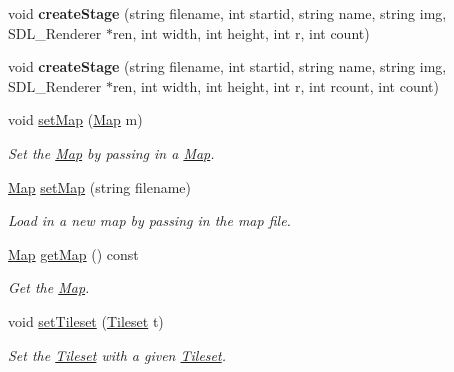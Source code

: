 \begin{DoxyCompactItemize}
void {\bfseries create\+Stage} (string filename, int startid, string name, string img, S\+D\+L\+\_\+\+Renderer $\ast$ren, int width, int height, int r, int count)
\item 
\mbox{\label{classStage_a2d9071d75c90883539cd303c128a6b7d}} 
void {\bfseries create\+Stage} (string filename, int startid, string name, string img, S\+D\+L\+\_\+\+Renderer $\ast$ren, int width, int height, int r, int rcount, int count)
\item 
\mbox{\label{classStage_a47a215785ca66ffae354c350aee1800e}} 
void \hyperlink{classStage_a47a215785ca66ffae354c350aee1800e}{set\+Map} (\hyperlink{classMap}{Map} m)
\begin{DoxyCompactList}\small\item\em Set the \hyperlink{classMap}{Map} by passing in a \hyperlink{classMap}{Map}. \end{DoxyCompactList}\item 
\mbox{\label{classStage_a11b7cabe85812fda7513d14d6b21ff6a}} 
\hyperlink{classMap}{Map} \hyperlink{classStage_a11b7cabe85812fda7513d14d6b21ff6a}{set\+Map} (string filename)
\begin{DoxyCompactList}\small\item\em Load in a new map by passing in the map file. \end{DoxyCompactList}\item 
\mbox{\label{classStage_a9f906d6b347432ddeee8894031a2c981}} 
\hyperlink{classMap}{Map} \hyperlink{classStage_a9f906d6b347432ddeee8894031a2c981}{get\+Map} () const
\begin{DoxyCompactList}\small\item\em Get the \hyperlink{classMap}{Map}. \end{DoxyCompactList}\item 
\mbox{\label{classStage_a63a19b471f7c54d68f3f7e4419eca8ac}} 
void \hyperlink{classStage_a63a19b471f7c54d68f3f7e4419eca8ac}{set\+Tileset} (\hyperlink{classTileset}{Tileset} t)
\begin{DoxyCompactList}\small\item\em Set the \hyperlink{classTileset}{Tileset} with a given \hyperlink{classTileset}{Tileset}. \end{DoxyCompactList}\item 

\end{DoxyCompactItemize}
